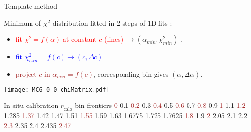 \begin{frame}{Template method}
  \begin{minipage}{0.59\linewidth}
    Minimum of $\chi^2$ distribution fitted in 2 steps of 1D fits : 
    \begin{itemize}
    \item \textcolor{red}{fit $\chi^2=f(\alpha)$ at constant $c$ (lines)} $\rightarrow (\alpha_{min}, \chi^2_{min})$ .
    \item \textcolor{blue}{fit $\chi^2_{min}=f(c)\rightarrow (c, \Delta c)$}
    \item \textcolor{brown}{project $c$ in $\alpha_{min}=f(c)$}, corresponding bin gives $(\alpha, \Delta\alpha)$.
    \end{itemize}
  \end{minipage}
\hfill
\begin{minipage}{0.4\linewidth}
  \texttt{[image: MC6\_0\_0\_chiMatrix.pdf]}\\
\end{minipage}


\end{frame}

\begin{frame}{In situ calibration $\eta_\text{calo}$ bin frontiers}
        {\tiny \textcolor{brown}{0} 0.1 \textcolor{brown}{0.2} 0.3 \textcolor{brown}{0.4} 0.5 \textcolor{brown}{0.6} 0.7 \textcolor{brown}{0.8} 0.9 \textcolor{brown}{1} 1.1 \textcolor{brown}{1.2} 1.285 \textcolor{brown}{1.37} 1.42 1.47 1.51 \textcolor{brown}{1.55} 1.59 1.63 1.6775 1.725 1.7625 \textcolor{brown}{1.8} 1.9 \textcolor{brown}{2} 2.05 2.1 2.2 \textcolor{brown}{2.3} 2.35 2.4 2.435 \textcolor{brown}{2.47}}
\end{frame}

